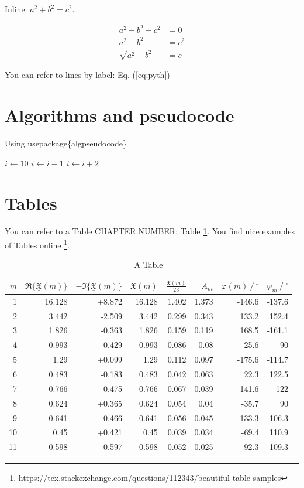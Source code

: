 Inline: $a^2+b^2=c^2$.

\begin{align}
a^2+b^2-c^2&=0\\
a^2+b^2&=c^2 \label{eq:pyth}\\
\sqrt{a^2+b^2}&=c
\end{align}

You can refer to lines by label: Eq. (\ref{eq:pyth})

\section{Algorithms and pseudocode}
Using usepackage\{algpseudocode\}
\\

\begin{algorithmic}
	\State $i \gets 10$
	\State $i \gets i-1$
	\Else
	\State $i \gets i+2$
	\EndIf
	\EndIf 
\end{algorithmic}

\section{Tables} 
You can refer to a Table CHAPTER.NUMBER: Table \ref{tab:example1}. You find nice examples of Tables online \footnote{\url{https://tex.stackexchange.com/questions/112343/beautiful-table-samples}}.
\begin{table}[!hb]
	\centering
	\begin{tabular}{rrrrrrrr} \toprule
		{$m$} & {$\Re\{\underline{\mathfrak{X}}(m)\}$} & {$-\Im\{\underline{\mathfrak{X}}(m)\}$} & {$\mathfrak{X}(m)$} & {$\frac{\mathfrak{X}(m)}{23}$} & {$A_m$} & {$\varphi(m)\ /\ ^{\circ}$} & {$\varphi_m\ /\ ^{\circ}$} \\ \midrule
		1  & 16.128 & +8.872 & 16.128 & 1.402 & 1.373 & -146.6 & -137.6 \\
		2  & 3.442  & -2.509 & 3.442  & 0.299 & 0.343 & 133.2  & 152.4  \\
		3  & 1.826  & -0.363 & 1.826  & 0.159 & 0.119 & 168.5  & -161.1 \\
		4  & 0.993  & -0.429 & 0.993  & 0.086 & 0.08  & 25.6   & 90     \\ \midrule
		5  & 1.29   & +0.099 & 1.29   & 0.112 & 0.097 & -175.6 & -114.7 \\
		6  & 0.483  & -0.183 & 0.483  & 0.042 & 0.063 & 22.3   & 122.5  \\
		7  & 0.766  & -0.475 & 0.766  & 0.067 & 0.039 & 141.6  & -122   \\
		8  & 0.624  & +0.365 & 0.624  & 0.054 & 0.04  & -35.7  & 90     \\ \midrule
		9  & 0.641  & -0.466 & 0.641  & 0.056 & 0.045 & 133.3  & -106.3 \\
		10 & 0.45   & +0.421 & 0.45   & 0.039 & 0.034 & -69.4  & 110.9  \\
		11 & 0.598  & -0.597 & 0.598  & 0.052 & 0.025 & 92.3   & -109.3 \\ \bottomrule
	\end{tabular}
\caption{A Table}
\label{tab:example1}
\end{table}



